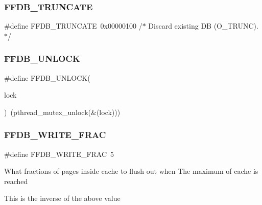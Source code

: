 \mbox{\label{adat-devel_2other__libs_2filedb_2filehash_2ffdb__pagepool_8h_a31c6f9982ed977047ebfdfbc58787424}} 
\subsubsection{\texorpdfstring{FFDB\_TRUNCATE}{FFDB\_TRUNCATE}}
{\footnotesize\ttfamily \#define F\+F\+D\+B\+\_\+\+T\+R\+U\+N\+C\+A\+TE~0x00000100    /$\ast$ Discard existing D\+B (\+O\+\_\+\+T\+R\+U\+N\+C). $\ast$/}

\mbox{\label{adat-devel_2other__libs_2filedb_2filehash_2ffdb__pagepool_8h_a770bd9e9fabaed425e3d471d346166bc}} 
\subsubsection{\texorpdfstring{FFDB\_UNLOCK}{FFDB\_UNLOCK}}
{\footnotesize\ttfamily \#define F\+F\+D\+B\+\_\+\+U\+N\+L\+O\+CK(\begin{DoxyParamCaption}\item[{}]{lock }\end{DoxyParamCaption})~(pthread\+\_\+mutex\+\_\+unlock(\&(lock)))}

\mbox{\label{adat-devel_2other__libs_2filedb_2filehash_2ffdb__pagepool_8h_a896afa4e850cfdef005b805712ed8812}} 
\subsubsection{\texorpdfstring{FFDB\_WRITE\_FRAC}{FFDB\_WRITE\_FRAC}}
{\footnotesize\ttfamily \#define F\+F\+D\+B\+\_\+\+W\+R\+I\+T\+E\+\_\+\+F\+R\+AC~5}

What fractions of pages inside cache to flush out when The maximum of cache is reached

This is the inverse of the above value 


